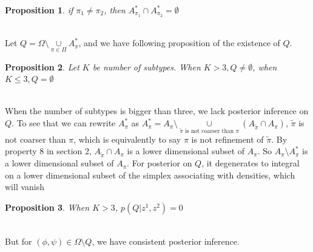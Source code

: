 \documentclass[aoas,preprint]{imsart}
\newtheorem{prop}{Proposition}
\begin{document}
\begin{prop}
if $\pi_1 \neq \pi_2$, then $A_{\pi_1}^*\cap A_{\pi_2}^* = \emptyset$
\end{prop}
\hfill\\
Let $Q = \Omega\setminus \underset{\pi\in \Pi}\cup A_\pi^*$, and we have following proposition of the existence of $Q$.
\begin{prop}
Let $K$ be number of subtypes. When $K >  3, Q \neq \emptyset$, when $K \leq 3, Q = \emptyset$
\end{prop}
\hfill\\
When the number of subtypes is bigger than three, we lack posterior inference on $Q$. To see that we can rewrite $A_\pi^*$ as $A_\pi^* = A_\pi\setminus \underset{\tilde{\pi} \text{ is not coarser than } \pi }\cup (A_{\tilde{\pi}}\cap A_\pi)$, $\tilde{\pi}$ is not coarser than $\pi$, which is equivalently to say $\pi$ is not refinement of $\tilde{\pi}$. By property 8 in section 2, $A_{\tilde{\pi}}\cap A_\pi$ is a lower dimensional subset of $A_\pi$. So $A_\pi \setminus A_\pi^*$ is a lower dimensional subset of $A_\pi$. For posterior on $Q$, it degenerates to integral on a lower dimensional subset of the simplex associating with densities, which will vanish\\
\begin{prop}
When $K >  3$, $p(Q | z^1, z^2) = 0$
\end{prop}
\hfill\\
But for $(\phi, \psi)\in \Omega\setminus Q$, we have consistent posterior inference. %
\end{document}
